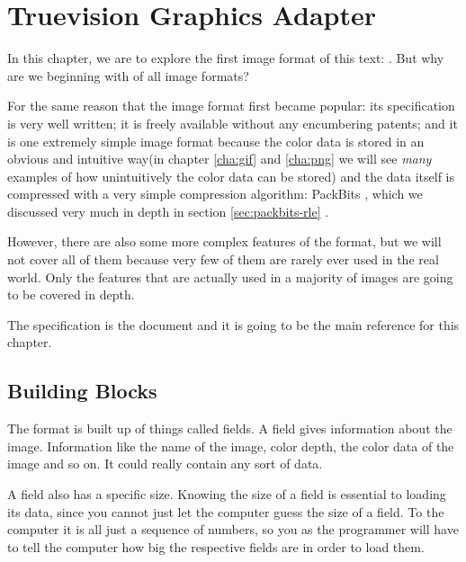 \begin{comment}
  
\end{comment}

\chapter{Truevision Graphics Adapter}
\label{cha:tga}

In this chapter, we are to explore the first image format of this
text: \tga. But why are we beginning with \tga of all image formats?

For the same reason that the image format first became popular: its
specification is very well written; it is freely available without any
encumbering patents; and it is one extremely simple image format
because the color data is stored in an obvious and intuitive way(in
chapter \ref{cha:gif} and \ref{cha:png} we will see \textit{many}
examples of how unintuitively the color data can be stored) and the
data itself is compressed with a very simple compression algorithm:
PackBits \rle, which we discussed very much in depth in section
\ref{sec:packbits-rle} \cite{murray1996encyclopedia}.

However, there are also some more complex features of the \tga format,
but we will not cover all of them because very few of them are rarely ever
used in the real world. Only the features that are actually used in a
majority of \tga images are going to be covered in depth.

The \tga specification is the document
\cite{91:_truev_tga_file_format_specif} and it is going to be the main
reference for this chapter.

\section{Building Blocks}

The \tga format is built up of things called fields. A field gives
information about the image. Information like the name of the image,
color depth, the color data of the image and so on. It could really
contain any sort of data.

A field also has a specific size. Knowing the size of a field is
essential to loading its data, since you cannot just let the computer
guess the size of a field. To the computer it is all just a sequence
of numbers, so you as the programmer will have to tell the computer
how big the respective fields are in order to load them.

